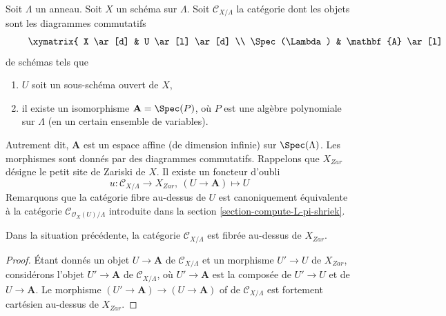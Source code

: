 \medskip\noindent
Soit $\Lambda$ un anneau. Soit $X$ un schéma sur $\Lambda$. Soit
$\mathcal{C}_{X/\Lambda}$ la catégorie dont les objets sont les diagrammes
commutatifs
\begin{equation}
\label{equation-object}
\vcenter{
\xymatrix{
X \ar[d] & U \ar[l] \ar[d] \\
\Spec(\Lambda) & \mathbf{A} \ar[l]
}
}
\end{equation}
de schémas tels que
\begin{enumerate}
\item $U$ soit un sous-schéma ouvert de $X$,
\item il existe un isomorphisme $\mathbf{A} = \Spec(P)$, où $P$ est une
algèbre polynomiale sur $\Lambda$ (en un certain ensemble de variables).
\end{enumerate}
Autrement dit, $\mathbf{A}$ est un espace affine (de dimension infinie) sur
$\Spec(\Lambda)$. Les morphismes sont donnés par des diagrammes commutatifs.
Rappelons que $X_{Zar}$ désigne le petit site de Zariski de $X$. Il existe un
foncteur d'oubli
$$
u : \mathcal{C}_{X/\Lambda} \to X_{Zar},\ (U \to \mathbf{A}) \mapsto U
$$
Remarquons que la catégorie fibre au-dessus de $U$ est canoniquement
équivalente à la catégorie $\mathcal{C}_{\mathcal{O}_X(U)/\Lambda}$ introduite
dans la section \ref{section-compute-L-pi-shriek}.

\begin{lemma}
\label{lemma-category-fibred}
Dans la situation précédente, la catégorie $\mathcal{C}_{X/\Lambda}$ est
fibrée au-dessus de $X_{Zar}$.
\end{lemma}

\begin{proof}
Étant donnés un objet $U \to \mathbf{A}$ de $\mathcal{C}_{X/\Lambda}$ et un
morphisme $U' \to U$ de $X_{Zar}$, considérons l'objet
$U' \to \mathbf{A}$ de $\mathcal{C}_{X/\Lambda}$, où
$U' \to \mathbf{A}$ est la composée de $U' \to U$ et de
$U \to \mathbf{A}$. Le morphisme
$(U' \to \mathbf{A}) \to (U \to \mathbf{A})$ of
de $\mathcal{C}_{X/\Lambda}$ est fortement cartésien au-dessus de $X_{Zar}$.
\end{proof}

